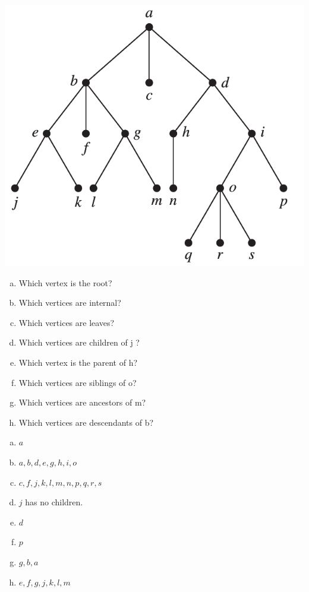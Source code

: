 \begin{itemize}
          \includegraphics[scale = 0.5]{img/11_1_4_graph.png} \\
          \begin{enumerate}[a.]
              \item Which vertex is the root?
              \item Which vertices are internal?
              \item Which vertices are leaves?
              \item Which vertices are children of j ?
              \item Which vertex is the parent of h?
              \item Which vertices are siblings of o?
              \item Which vertices are ancestors of m?
              \item Which vertices are descendants of b?
          \end{enumerate}
          \answer
          \begin{enumerate}[a.]
              \item $a$
              \item $a, b, d, e, g, h, i, o$
              \item $c, f, j, k, l, m, n, p, q, r, s$
              \item $j$ has no children.
              \item $d$
              \item $p$
              \item $g, b, a$
              \item $e, f, g, j, k, l, m$
          \end{enumerate}


\end{itemize}
